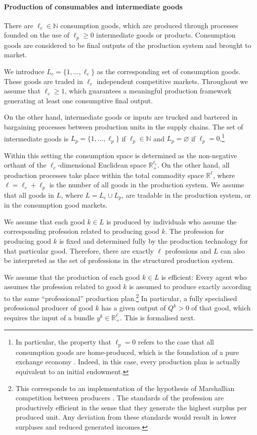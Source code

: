 \documentclass[11pt,fleqn]{article}
\begin{document}
\paragraph{Production of consumables and intermediate goods}

There are $\ell_c \in \mathbb N$ consumption goods, which are produced through processes founded on the use of $\ell_p \geqslant 0$ intermediate goods or products. Consumption goods are considered to be final outputs of the production system and brought to market. 

We introduce $L_c = \{ 1, \ldots , \ell_c \}$ as the corresponding set of consumption goods. These goods are traded in $\ell_c$ independent competitive markets. Throughout we assume that $\ell_c \geqslant 1$, which guarantees a meaningful production framework generating at least one consumptive final output.

On the other hand, intermediate goods or inputs are trucked and bartered in bargaining processes between production units in the supply chains. The set of intermediate goods is $L_p = \{1, \ldots, \ell_p\}$ if $\ell_p \in \mathbb N$ and $L_p = \varnothing$ if $\ell_p =0$.\footnote{In particular, the property that $\ell_p = 0$ refers to the case that all consumption goods are home-produced, which is the foundation of a pure exchange economy \citep{ArrowDebreu1954,Debreu1959}. Indeed, in this case, every production plan is actually equivalent to an initial endowment.}

Within this setting the consumption space is determined as the non-negative orthant of the $\ell_c$-dimensional Euclidean space $\mathbb R^{\ell_c}_+$. On the other hand, all production processes take place within the total commodity space $\mathbb R^{\ell}$, where $\ell = \ell_c + \ell_p$ is the number of all goods in the production system. We assume that all goods in $L$, where $L = L_c \cup L_p$, are tradable in the production system, or in the consumption good markets. 

We assume that each good $k \in L$ is produced by individuals who assume the corresponding profession related to producing good $k$. The profession for producing good $k$ is fixed and determined fully by the production technology for that particular good. Therefore, there are exactly $\ell$ professions and $L$ can also be interpreted as the set of professions in the structured production system. 

We assume that the production of each good $k \in L$ is efficient: Every agent who assumes the profession related to good $k$ is assumed to produce exactly according to the same ``professional'' production plan.\footnote{This corresponds to an implementation of the hypothesis of Marshallian competition between producers \citep{Marshall1890}. The standards of the profession are productively efficient in the sense that they generate the highest surplus per produced unit. Any deviation from these standards would result in lower surpluses and reduced generated incomes.} In particular, a fully specialised professional producer of good $k$ has a given output of $Q^k >0$ of that good, which requires the input of a bundle $y^k \in \mathbb R^{\ell}_+$. This is formalised next.
\end{document}
